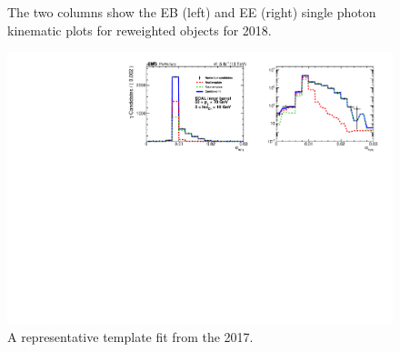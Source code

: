 \begin{figure}[!htbp]
\caption{The two columns show the EB (left) and EE (right) single photon kinematic plots for reweighted objects for 2018.}
\label{fig:kinematics18}
\end{figure}



\begin{figure}[!htbp]
\centering
\includegraphics[scale=0.85]{fig/fakeRatePlot_all_2017_EB1_pT50To70_chIso5To10.pdf}
\caption{A representative template fit from the 2017.}
\label{fig:templatefit_2017_etabinned}
\end{figure}

